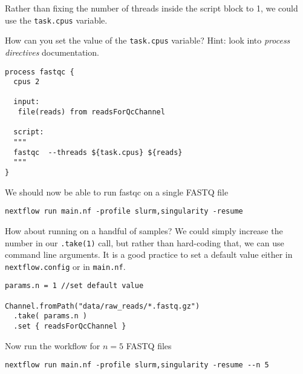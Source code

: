 \begin{bonus}
Rather than fixing the number of threads inside the script block to 1, we could use the \texttt{task.cpus} variable. 

\begin{questions}
How can you set the value of the \texttt{task.cpus} variable? Hint: look into \emph{process directives} documentation.
\begin{answer}
\begin{lstlisting}
process fastqc {
  cpus 2
    
  input:
   file(reads) from readsForQcChannel

  script:
  """
  fastqc  --threads ${task.cpus} ${reads}
  """
}
\end{lstlisting}
\end{answer}
\end{questions}
\end{bonus}


We should now be able to run fastqc on a single FASTQ file

\begin{steps}
\begin{lstlisting}
nextflow run main.nf -profile slurm,singularity -resume
\end{lstlisting}
\end{steps}

How about running on a handful of samples? We could simply increase the number in our \texttt{.take(1)} call, but rather than hard-coding that, we can use command line arguments. It is a good practice to set a default value either in \texttt{nextflow.config} or in \texttt{main.nf}.

\begin{lstlisting}
params.n = 1 //set default value

Channel.fromPath("data/raw_reads/*.fastq.gz")
  .take( params.n )
  .set { readsForQcChannel }
\end{lstlisting}

Now run the workflow for $n = 5$ FASTQ files

\begin{steps}
\begin{lstlisting}
nextflow run main.nf -profile slurm,singularity -resume --n 5
\end{lstlisting}
\end{steps}

